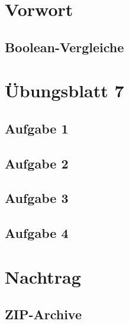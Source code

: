 \documentclass[aspectratio=169,usepdftitle=true,11pt,ngerman,t]{beamer}
\subtitle{Tutorium 8}
\date{06. Dezember 2024}
\begin{document}
\section[Ich muss noch ein wenig schimpfen...]{Vorwort}

\subsection{Boolean-Vergleiche}



\section[Java ist auch eine Insel!]{Übungsblatt 7}

\subsection{Aufgabe 1}
% 

\subsection{Aufgabe 2}
% 

\subsection{Aufgabe 3}
% 

\subsection{Aufgabe 4}
% 

\section[Von Päckchen und Paketen...]{Nachtrag}

\subsection{ZIP-Archive}
\end{document}
